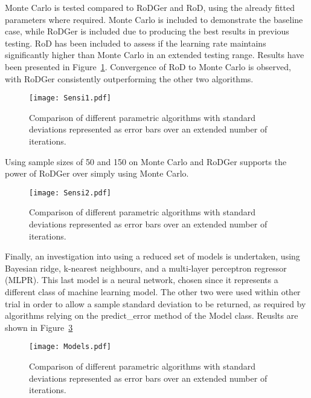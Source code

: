 Monte Carlo is tested compared to RoDGer and RoD, using the already fitted parameters where required. Monte Carlo is included to demonstrate the baseline case, while RoDGer is included due to producing the best results in previous testing. RoD has been included to assess if the learning rate maintains significantly higher than Monte Carlo in an extended testing range. Results have been presented in Figure~\ref{fig:sensi1}. Convergence of RoD to Monte Carlo is observed, with RoDGer consistently outperforming the other two algorithms.

\begin{figure}[H]
    \begin{center}
        \texttt{[image: Sensi1.pdf]}
        \caption[Results of prolonged sampling]{Comparison of different parametric algorithms with standard deviations represented as error bars over an extended number of iterations.}
        \label{fig:sensi1}
    \end{center}
\end{figure}

Using sample sizes of 50 and 150 on Monte Carlo and RoDGer supports the power of RoDGer over simply using Monte  Carlo.

\begin{figure}[H]
    \begin{center}
        \texttt{[image: Sensi2.pdf]}
        \caption[Results of prolonged sampling]{Comparison of different parametric algorithms with standard deviations represented as error bars over an extended number of iterations.}
        \label{fig:sensi2}
    \end{center}
\end{figure}

Finally, an investigation into using a reduced set of models is undertaken, using Bayesian ridge, k-nearest neighbours, and a multi-layer perceptron regressor (MLPR). This last model is a neural network, chosen since it represents a different class of machine learning model. The other two were used within other trial in order to allow a sample standard deviation to be returned, as required by algorithms relying on the predict\_error method of the Model class. Reuslts are shown in Figure~\ref{fig:modelSensi}

\begin{figure}[H]
    \begin{center}
        \texttt{[image: Models.pdf]}
        \caption[Sensitivity to Model Selection]{Comparison of different parametric algorithms with standard deviations represented as error bars over an extended number of iterations.}
        \label{fig:modelSensi}
    \end{center}
\end{figure}


